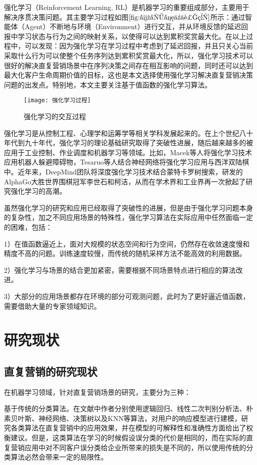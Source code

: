 强化学习（Reinforcement Learning, RL）是机器学习的重要组成部分，主要用于解决序贯决策问题。其主要学习过程如图$\ref{fig:强化学习过程}$所示：通过智能体（Agent）不断地与环境（Environment）进行交互，并从环境反馈的延迟回报中学习状态与行为之间的映射关系，以使得可以达到累积奖赏最大化。在以上过程中，可以发现：因为强化学习在学习过程中考虑到了延迟回报，并且只关心当前采取什么行为可以使整个任务序列达到累积奖赏最大化，所以，强化学习技术可以很好的解决直复营销场景中在序列决策之间存在相互影响的问题，同时还可以达到最大化客户生命周期价值的目标，这也是本文选择使用强化学习解决直复营销决策问题的出发点。特别地，本文主要关注基于值函数的强化学习算法。
\begin{figure}[htbp]
\centering
\texttt{[image: 强化学习过程]}
\caption{强化学习的交互过程}
\label{fig:强化学习过程}
\end{figure}

强化学习是从控制工程、心理学和运筹学等相关学科发展起来的。在上个世纪八十年代到九十年代，强化学习的理论基础研究取得了突破性进展，随后越来越多的被应用于工业控制、作业调度和机器学习等领域。比如，Macek等人将强化学习技术应用机器人躲避障碍物，Tesaruo等人结合神经网络将强化学习应用与西洋双陆棋中。近年来，DeepMind团队将深度强化学习技术结合蒙特卡罗树搜索，研发的AlphaGo大胜世界围棋冠军李世石和柯洁，从而在学术界和工业界再一次掀起了研究强化学习的高潮。

虽然强化学习的研究和应用已经取得了突破性的进展，但是由于强化学习问题本身的复杂性，加之不同应用场景的特殊性，强化学习算法在实际应用中任然面临一定的困难，包括：

1）在值函数逼近上，面对大规模的状态空间和行为空间，仍然存在收敛速度慢和精度不高的问题。训练速度较慢，而传统的随机采样方法不能高效的利用数据。

2）强化学习与场景的结合更加紧密，需要根据不同场景特点进行相应的算法改进。

3）大部分的应用场景都存在环境的部分可观测问题，此时为了更好逼近值函数，需要借助大量的专家领域知识。

\section{研究现状}

\subsection{直复营销的研究现状}
在机器学习领域，针对直复营销场景的研究，主要分为三种：

基于传统的分类算法。在文献\citep{alam2012actionable, ngai2009application, wong2005mining, coussement2015improving}中作者分别使用逻辑回归、线性二次判别分析法、朴素贝叶斯、神经网络、决策树以及KNN等算法，对用户的响应模型进行建模，研究各类算法在直复营销中的应用效果，并在模型的可解释性和准确性方面给出了权衡建议。但是，这类算法在学习的时候假设误分类的代价是相同的，而在实际的直复营销应用中对不同客户误分类给企业所带来的损失是不同的，所以使用传统的分类算法必然会带来一定的局限性。

